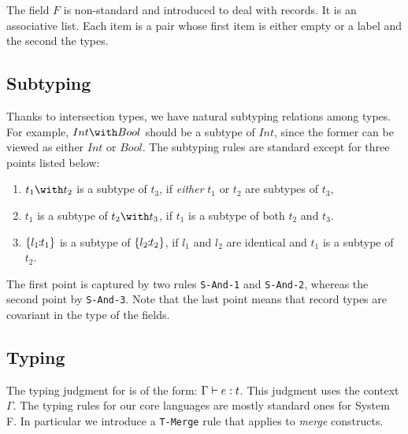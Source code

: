The field $ F $ is non-standard and introduced to deal with records. It is an
associative list. Each item is a pair whose first item is either empty or a
label and the second the types.




\subsection{Subtyping}



Thanks to intersection types, we have natural subtyping relations among types.
For example, $ Int \with Bool $ should be a subtype of $ Int $, since the former
can be viewed as either $ Int $ or $ Bool $. The subtyping rules are standard
except for three points listed below:
\begin{enumerate}
\item $ t_1 \with t_2 $ is a subtype of $ t_3 $, if \emph{either} $ t_1 $ or
  $ t_2 $ are subtypes of $ t_3 $,

\item $ t_1 $ is a subtype of $ t_2 \with t_3 $, if $ t_1 $ is a subtype of
  both $ t_2 $ and $ t_3 $.

\item $ \{ l_1 \!\!:\!\! t_1 \} $ is a subtype of $ \{ l_2 \!\!:\!\! t_2 \} $, if
  $ l_1 $ and $ l_2 $ are identical and $ t_1 $ is a subtype of $ t_2 $.
\end{enumerate}
The first point is captured by two rules \texttt{S-And-1} and \texttt{S-And-2},
whereas the second point by \texttt{S-And-3}. Note that the last point means
that record types are covariant in the type of the fields.

\subsection{Typing}

The typing judgment for \name is of the form: $ \Gamma \vdash e : t $. This
judgment uses the context $ \Gamma $. The typing rules for our core languages
are mostly standard ones for System F. In particular we introduce a
\texttt{T-Merge} rule that applies to \emph{merge} constructs.

